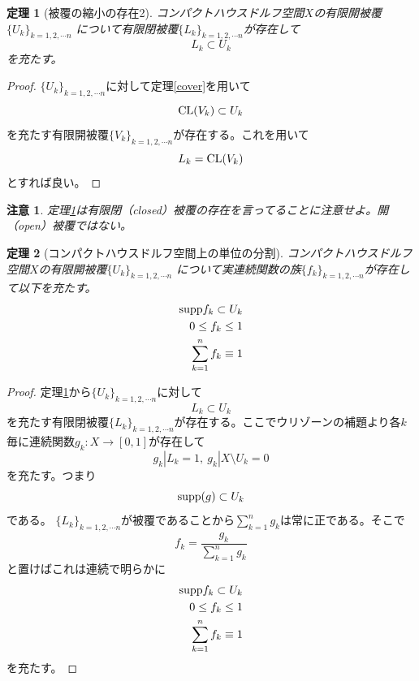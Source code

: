 \documentclass{jsarticle}
\newtheorem{thm}{定理}
\newtheorem*{cau}{注意}
\newcommand{\dpst}{\displaystyle}
\newcommand{\supp}{\text{{\rm supp}}}
\newcommand{\cl}{\text{{\rm CL}}}
\begin{document}
\begin{thm}[被覆の縮小の存在2]\label{cover2}
コンパクトハウスドルフ空間$X$の有限開被覆$\{U_k\}_{k=1,2,\cdots n}$
について有限閉被覆$\{L_k\}_{k=1,2,\cdots n}$が存在して
\[
L_k\subset U_k
\]
を充たす。
\end{thm}
\begin{proof}
$\{U_k\}_{k=1,2,\cdots n}$に対して定理\ref{cover}を用いて
\[
\cl(V_k)\subset U_k
\]
を充たす有限開被覆$\{V_k\}_{k=1,2,\cdots n}$が存在する。これを用いて
\[
L_k=\cl(V_k)
\]
とすれば良い。
\end{proof}
\begin{cau}定理\ref{cover2}は有限閉（closed）被覆の存在を言ってることに注意せよ。開（open）被覆ではない。
\end{cau}

\begin{thm}[コンパクトハウスドルフ空間上の単位の分割]\label{pat}
コンパクトハウスドルフ空間$X$の有限開被覆$\{U_k\}_{k=1,2,\cdots n}$
について実連続関数の族$\{f_k\}_{k=1,2,\cdots n}$が存在して以下を充たす。
\begin{eqnarray*}
\supp f_k\subset U_k\\ 
0\le f_k \le1\\ 
\sum_{k=1}^{n}f_k\equiv 1
\end{eqnarray*}
\end{thm}
\begin{proof}
定理\ref{cover2}から$\{U_k\}_{k=1,2,\cdots n}$に対して
\[
L_k\subset U_k
\]
を充たす有限閉被覆$\{L_k\}_{k=1,2,\cdots n}$が存在する。ここでウリゾーンの補題より各$k$毎に連続関数$g_k:X\to [0,1]$が存在して
\[
g_k|L_k=1,\ g_k|X\setminus U_k=0
\]
を充たす。つまり
\[
\supp (g)\subset U_k
\]
である。
$\{L_k\}_{k=1,2,\cdots n}$が被覆であることから$\dpst \sum_{k=1}^ng_k$は常に正である。そこで
\[
f_k=\frac{g_k}{\sum_{k=1}^ng_k}
\]と置けばこれは連続で明らかに
\begin{eqnarray*}
\supp f_k\subset U_k\\ 
0\le f_k \le1\\ 
\sum_{k=1}^{n}f_k\equiv 1
\end{eqnarray*}
を充たす。
\end{proof}
\end{document}
